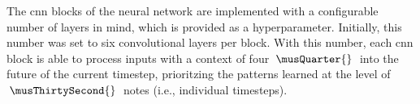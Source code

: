 
The \gls{cnn} blocks of the neural network are implemented
with a configurable number of layers in mind, which is
provided as a hyperparameter. Initially, this number was set
to six convolutional layers per block. With this number,
each \gls{cnn} block is able to process inputs with a
context of four $\: \musQuarter{} \:$ into the future of the
current timestep, prioritzing the patterns learned at the
level of $\: \musThirtySecond{} \:$ notes (i.e., individual
timesteps).
